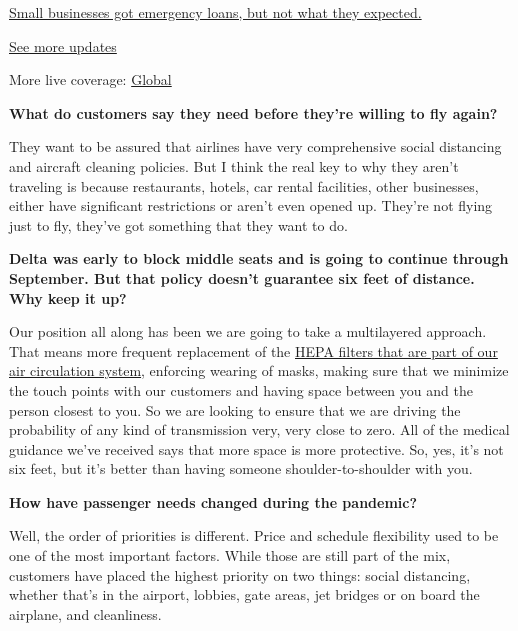\href{https://www.nytimes.com/live/2020/08/03/business/stock-market-today-coronavirus?action=click\&pgtype=Article\&state=default\&region=MAIN_CONTENT_1\&context=storylines_live_updates\#small-businesses-got-emergency-loans-but-not-what-they-expected}{Small
businesses got emergency loans, but not what they expected.}

\href{https://www.nytimes.com/live/2020/08/03/business/stock-market-today-coronavirus?action=click\&pgtype=Article\&state=default\&region=MAIN_CONTENT_1\&context=storylines_live_updates}{See
more updates}

More live coverage:
\href{https://www.nytimes.com/2020/08/03/world/coronavirus-covid-19.html?action=click\&pgtype=Article\&state=default\&region=MAIN_CONTENT_1\&context=storylines_live_updates}{Global}

\textbf{What do customers say they need before they're willing to fly
again?}

They want to be assured that airlines have very comprehensive social
distancing and aircraft cleaning policies. But I think the real key to
why they aren't traveling is because restaurants, hotels, car rental
facilities, other businesses, either have significant restrictions or
aren't even opened up. They're not flying just to fly, they've got
something that they want to do.

\textbf{Delta was early to block middle seats and is going to continue
through September. But that policy doesn't guarantee six feet of
distance. Why keep it up?}

Our position all along has been we are going to take a multilayered
approach. That means more frequent replacement of the
\href{https://www.nytimes.com/2020/04/30/business/airlines-masks-coronavirus-passengers.html}{HEPA
filters that are part of our air circulation system}, enforcing wearing
of masks, making sure that we minimize the touch points with our
customers and having space between you and the person closest to you. So
we are looking to ensure that we are driving the probability of any kind
of transmission very, very close to zero. All of the medical guidance
we've received says that more space is more protective. So, yes, it's
not six feet, but it's better than having someone shoulder-to-shoulder
with you.

\textbf{How have passenger needs changed during the pandemic?}

Well, the order of priorities is different. Price and schedule
flexibility used to be one of the most important factors. While those
are still part of the mix, customers have placed the highest priority on
two things: social distancing, whether that's in the airport, lobbies,
gate areas, jet bridges or on board the airplane, and cleanliness.

